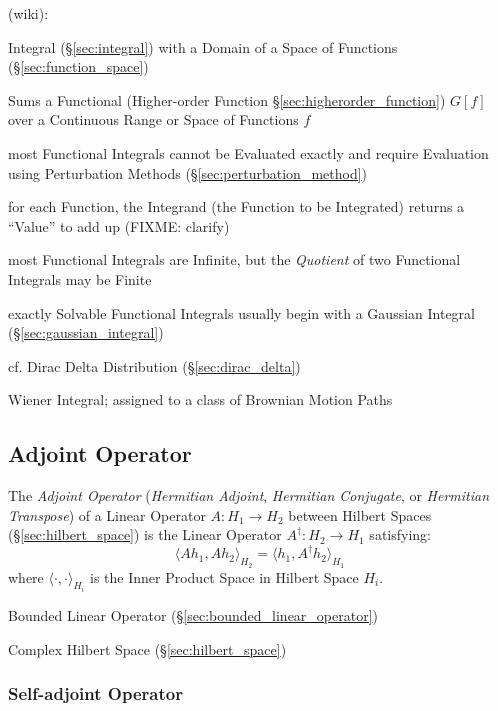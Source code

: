 (wiki):

Integral (\S\ref{sec:integral}) with a Domain of a Space of Functions
(\S\ref{sec:function_space})

Sums a Functional (Higher-order Function \S\ref{sec:higherorder_function})
$G[f]$ over a Continuous Range or Space of Functions $f$

most Functional Integrals cannot be Evaluated exactly and require Evaluation
using Perturbation Methods (\S\ref{sec:perturbation_method})

for each Function, the Integrand (the Function to be Integrated) returns a
``Value'' to add up (FIXME: clarify)

most Functional Integrals are Infinite, but the \emph{Quotient} of two
Functional Integrals may be Finite

exactly Solvable Functional Integrals usually begin with a Gaussian Integral
(\S\ref{sec:gaussian_integral})

cf. Dirac Delta Distribution (\S\ref{sec:dirac_delta})

Wiener Integral; assigned to a class of Brownian Motion Paths



\subsection{Adjoint Operator}\label{sec:adjoint_operator}

The \emph{Adjoint Operator} (\emph{Hermitian Adjoint}, \emph{Hermitian
  Conjugate}, or \emph{Hermitian Transpose}) of a Linear Operator $A : H_1
\rightarrow H_2$ between Hilbert Spaces (\S\ref{sec:hilbert_space}) is the
Linear Operator $A^\dag : H_2 \rightarrow H_1$ satisfying:
\[
  \langle{Ah_1,Ah_2}\rangle_{H_2} = \langle{h_1,A^{\dag}h_2}\rangle_{H_1}
\]
where $\langle\cdot,\cdot\rangle_{H_i}$ is the Inner Product Space in Hilbert
Space $H_i$.


Bounded Linear Operator (\S\ref{sec:bounded_linear_operator})

Complex Hilbert Space (\S\ref{sec:hilbert_space})



\subsubsection{Self-adjoint Operator}\label{sec:self_adjoint_operator}

